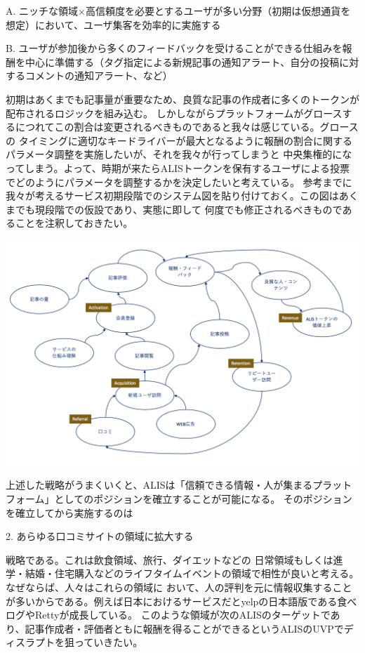 \documentclass{jsarticle}
\begin{document}
A. ニッチな領域×高信頼度を必要とするユーザが多い分野（初期は仮想通貨を想定）において、ユーザ集客を効率的に実施する

B. ユーザが参加後から多くのフィードバックを受けることができる仕組みを報酬を中心に準備する（タグ指定による新規記事の通知アラート、自分の投稿に対するコメントの通知アラート、など）

初期はあくまでも記事量が重要なため、良質な記事の作成者に多くのトークンが配布されるロジックを組み込む。
しかしながらプラットフォームがグロースするにつれてこの割合は変更されるべきものであると我々は感じている。グロースの
タイミングに適切なキードライバーが最大となるように報酬の割合に関するパラメータ調整を実施したいが、それを我々が行ってしまうと
中央集権的になってしまう。よって、時期が来たらALISトークンを保有するユーザによる投票でどのようにパラメータを調整するかを決定したいと考えている。
参考までに我々が考えるサービス初期段階でのシステム図を貼り付けておく。この図はあくまでも現段階での仮設であり、実態に即して
何度でも修正されるべきものであることを注釈しておきたい。

\begin{center}
	\includegraphics[scale=0.6]{img/systemthinking-with-AARRR.png}
\end{center}

上述した戦略がうまくいくと、ALISは「信頼できる情報・人が集まるプラットフォーム」としてのポジションを確立することが可能になる。
そのポジションを確立してから実施するのは

2. あらゆる口コミサイトの領域に拡大する

戦略である。これは飲食領域、旅行、ダイエットなどの
日常領域もしくは進学・結婚・住宅購入などのライフタイムイベントの領域で相性が良いと考える。なぜならば、人々はこれらの領域に
おいて、人の評判を元に情報収集することが多いからである。例えば日本におけるサービスだとyelpの日本語版である食べログやRettyが成長している。
このような領域が次のALISのターゲットであり、記事作成者・評価者ともに報酬を得ることができるというALISのUVPでディスラプトを狙っていきたい。
\end{document}
